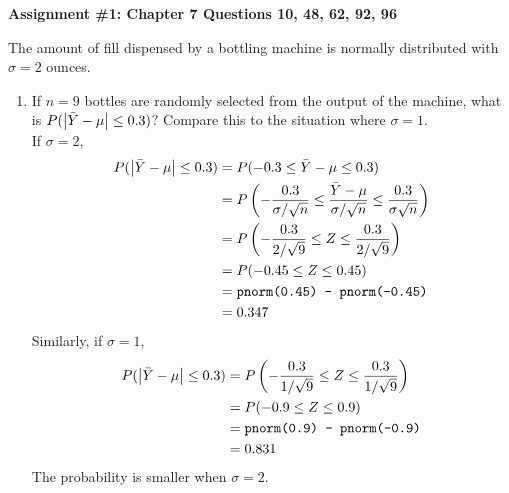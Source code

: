 \documentclass[12pt]{article}
\newcommand{\ques}[1]{\noindent {\bf Question #1: }}
\begin{document}
\begin{center} \textbf{Assignment \#1: Chapter 7 Questions 10, 48, 62, 92, 96} \end{center}

\ques{7.10} The amount of fill dispensed by a bottling machine is normally distributed with $\sigma = 2$ ounces. \begin{enumerate} 
\item If $n=9$ bottles are randomly selected from the output of the machine, what is $P(\abs{\bar{Y} - \mu} \leq 0.3)$? Compare this to the situation where $\sigma = 1$. \\
If $\sigma = 2$, $$ \begin{aligned} P(\abs{\bar{Y} - \mu} \leq 0.3) &= P(-0.3 \leq \bar{Y} - \mu \leq 0.3) \\ &= P\left(-\frac{0.3}{\sigma / \sqrt{n}} \leq \frac{\bar{Y} - \mu}{\sigma / \sqrt{n}} \leq \frac{0.3}{\sigma \sqrt{n}}\right) \\ &= P\left( -\frac{0.3}{2 / \sqrt{9}} \leq Z \leq \frac{0.3}{2 / \sqrt{9}}\right) \\ &= P(-0.45 \leq Z \leq 0.45) \\ &= \texttt{pnorm(0.45) - pnorm(-0.45)} \\ &= 0.347  \end{aligned} $$ 
Similarly, if $\sigma = 1$, $$ \begin{aligned} P(\abs{\bar{Y} - \mu} \leq 0.3) &= P\left( -\frac{0.3}{1 / \sqrt{9}} \leq Z \leq \frac{0.3}{1 / \sqrt{9}}\right) \\ &= P(-0.9 \leq Z \leq 0.9) \\ &= \texttt{pnorm(0.9) - pnorm(-0.9)} \\ &= 0.831  \end{aligned} $$ 
The probability is smaller when $\sigma=2$. 


\end{enumerate}
\end{document}
